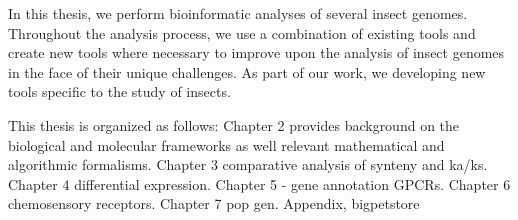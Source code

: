 In this thesis, we perform bioinformatic analyses of several insect genomes. Throughout the analysis process, we use a combination of existing tools and create new tools where necessary to improve upon the analysis of insect genomes in the face of their unique challenges.  As part of our work, we developing new tools specific to the study of insects.

This thesis is organized as follows: Chapter 2 provides background on the biological and molecular frameworks as well relevant mathematical and algorithmic formalisms. Chapter 3 comparative analysis of synteny and ka/ks. Chapter 4 differential expression. Chapter 5 - gene annotation GPCRs. Chapter 6 chemosensory receptors. Chapter 7 pop gen. Appendix, bigpetstore